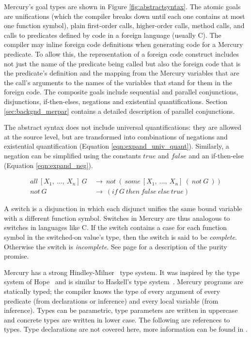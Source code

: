 \noindent
Mercury's goal types are shown in Figure \ref{fig:abstractsyntax}.
The atomic goals are unifications
(which the compiler breaks down until each one contains
at most one function symbol),
plain first-order calls,
higher-order calls,
method calls,
and calls to predicates defined by code in a foreign language (usually C).
The compiler may inline foreign code definitions when generating code
for a Mercury predicate.
To allow this, the representation of a foreign code construct includes
not just the name of the predicate being called
but also the foreign code that is the predicate's definition
and the mapping from the Mercury variables that are the call's arguments
to the names of the variables that stand for them in the foreign code.
The composite goals include
sequential and parallel conjunctions,
disjunctions, if-then-elses, negations and existential quantifications.
Section \ref{sec:backgnd_merpar} contains a detailed description of parallel
conjunctions.

The abstract syntax does not include universal quantifications:
they are allowed at the source level,
but are transformed into combinations of negations and existential quantification
(Equation \ref{eqn:expand_univ_quant}).
Similarly,
a negation can be simplified using the constants $true$ and $false$ and an
if-then-else (Equation \ref{eqn:expand_neg}).

\begin{align}
all~[X_1,~\ldots,~X_n]~G~&\rightarrow~not~(~some~[X_1,~\ldots,~X_n]~(~not~G~))
\label{eqn:expand_univ_quant}
\\
not~G~&\rightarrow~(if~G~then~false~else~true)
\label{eqn:expand_neg}
\end{align}

A switch is a disjunction in which
each disjunct unifies the same bound variable
with a different function symbol.
Switches in Mercury are thus analogous to switches in languages like C.
If the switch contains a case for each function symbol in the
switched-on value's type, then the switch is said to be \emph{complete}.
Otherwise the switch is \emph{incomplete}.
See page \pageref{page:purity} for a description of the purity promise.

Mercury has a strong Hindley-Milner~\citep{hindley69:types,milner78:types} type
system.
It was inspired by the type system of Hope~\citep{hope}
and is similar to Haskell's type system~\citep{haskell98}.
Mercury programs are statically typed; the compiler knows the type of every
argument of every predicate (from declarations or inference) and every local
variable (from inference).
Types can be parametric,
type parameters are written in uppercase and
concrete types are written in lower case.
The following are references to types.
Type declarations are not covered here,
more information can be found in \citet{mercury_refman}.

